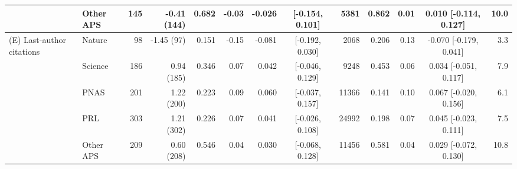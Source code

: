 {\begin{tabular}{llrrrrrcrrrcr}
 & Other APS & 145 & -0.41 (144) & 0.682 & -0.03 & -0.026 & [-0.154, 0.101] & 5381 & 0.862 & 0.01 & 0.010 [-0.114, 0.127] & 10.0 \\
\midrule
(E) Last-author citations & Nature & 98 & -1.45 (97) & 0.151 & -0.15 & -0.081 & [-0.192, 0.030] & 2068 & 0.206 & 0.13 & -0.070 [-0.179, 0.041] & 3.3 \\
 & Science & 186 & 0.94 (185) & 0.346 & 0.07 & 0.042 & [-0.046, 0.129] & 9248 & 0.453 & 0.06 & 0.034 [-0.051, 0.117] & 7.9 \\
 & PNAS & 201 & 1.22 (200) & 0.223 & 0.09 & 0.060 & [-0.037, 0.157] & 11366 & 0.141 & 0.10 & 0.067 [-0.020, 0.156] & 6.1 \\
 & PRL & 303 & 1.21 (302) & 0.226 & 0.07 & 0.041 & [-0.026, 0.108] & 24992 & 0.198 & 0.07 & 0.045 [-0.023, 0.111] & 7.5 \\
 & Other APS & 209 & 0.60 (208) & 0.546 & 0.04 & 0.030 & [-0.068, 0.128] & 11456 & 0.581 & 0.04 & 0.029 [-0.072, 0.130] & 10.8 \\
\bottomrule
\end{tabular}%
}
